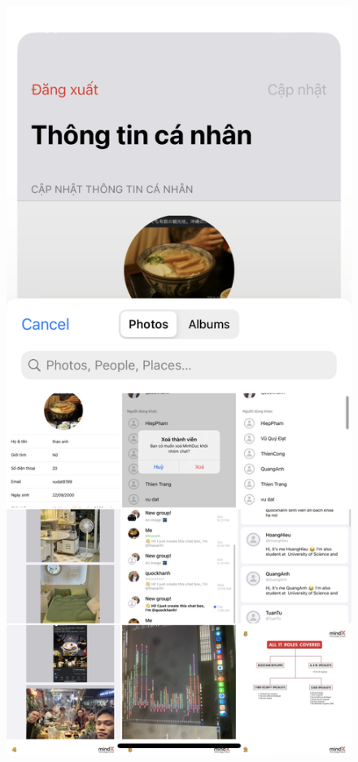 \documentclass[../DoAn.tex]{subfiles}
\begin{document}
\begin{figure}[H]
\begin{minipage}{0.5\textwidth}
\includegraphics[width=0.95\linewidth]{Hinhve/Application/Change_Avatar.png}

\end{minipage}
\end{figure}
\end{document}
